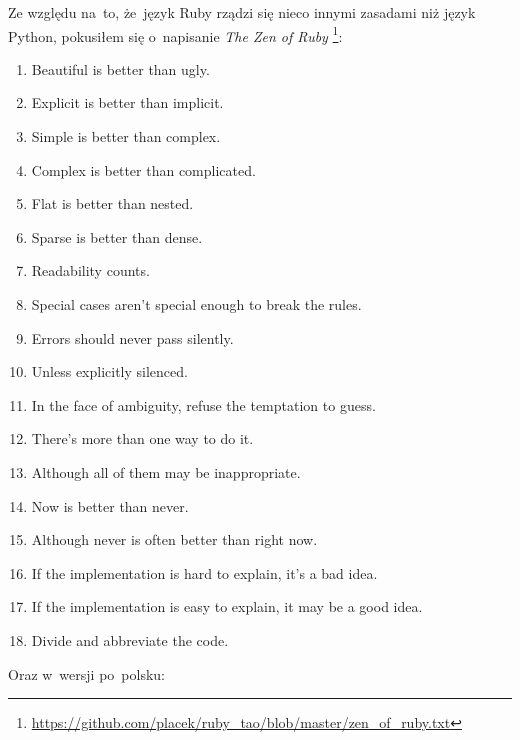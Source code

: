 Ze względu na~to, że~język Ruby rządzi się nieco innymi zasadami niż język Python, pokusiłem się o~napisanie \textit{The Zen of Ruby} \footnote{\url{https://github.com/placek/ruby\_tao/blob/master/zen\_of\_ruby.txt}}:

\begin{enumerate}
  \item Beautiful is better than ugly.
  \item Explicit is better than implicit.
  \item Simple is better than complex.
  \item Complex is better than complicated.
  \item Flat is better than nested.
  \item Sparse is better than dense.
  \item Readability counts.
  \item Special cases aren't special enough to break the rules.
  \item Errors should never pass silently.
  \item Unless explicitly silenced.
  \item In the face of ambiguity, refuse the temptation to guess.
  \item There's more than one way to do it.
  \item Although all of them may be inappropriate.
  \item Now is better than never.
  \item Although never is often better than right now.
  \item If the implementation is hard to explain, it's a bad idea.
  \item If the implementation is easy to explain, it may be a good idea.
  \item Divide and abbreviate the code.
\end{enumerate}

Oraz w~wersji po~polsku:

